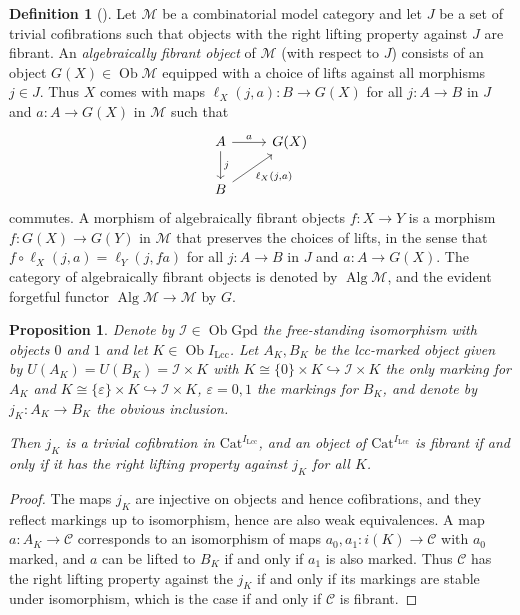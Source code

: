\documentclass[a4paper]{article}
\newtheorem{proposition}[theorem]{Proposition}
\theoremstyle{remark}
\theoremstyle{definition}
\newtheorem{definition}[theorem]{Definition}
\begin{document}
\begin{definition}[\cite{algebraic-models}]
  \label{def:algebraically-fibrant-objects}
  Let $\mathcal{M}$ be a combinatorial model category and let $J$ be a set of trivial cofibrations such that objects with the right lifting property against $J$ are fibrant.
  An \emph{algebraically fibrant object} of $\mathcal{M}$ (with respect to $J$) consists of an object $G(X) \in \operatorname{Ob} \mathcal{M}$ equipped with a choice of lifts against all morphisms $j \in J$.
  Thus $X$ comes with maps $\ell_X({j, a}) : B \rightarrow G(X)$ for all $j : A \rightarrow B$ in $J$ and $a : A \rightarrow G(X)$ in $\mathcal{M}$ such that
  \begin{equation}
    \begin{tikzcd}
      A \arrow[d, "j"] \arrow[r, "a"] & G(X) \\
      B \arrow[ur, "{\ell_X(j, a)}"']
    \end{tikzcd}
  \end{equation}
  commutes.
  A morphism of algebraically fibrant objects $f : X \rightarrow Y$ is a morphism $f : G(X) \rightarrow G(Y)$ in $\mathcal{M}$ that preserves the choices of lifts, in the sense that $f \circ \ell_X(j, a) = \ell_Y(j, fa)$ for all $j : A \rightarrow B$ in $J$ and $a : A \rightarrow G(X)$.
  The category of algebraically fibrant objects is denoted by $\operatorname{Alg} \mathcal{M}$, and the evident forgetful functor $\operatorname{Alg} \mathcal{M} \rightarrow \mathcal{M}$ by $G$.
\end{definition}

\begin{proposition}
  \label{prop:object-generating-triv-cof-marked}
  Denote by $\mathcal{I} \in \operatorname{Ob} \mathrm{Gpd}$ the free-standing isomorphism with objects $0$ and $1$ and let $K \in \operatorname{Ob} I_\mathrm{Lcc}$.
  Let $A_K, B_K$ be the lcc-marked object given by $U(A_K) = U(B_K) = \mathcal{I} \times K$ with $K \cong \{ 0 \} \times K \hookrightarrow \mathcal{I} \times K$ the only marking for $A_K$ and $K \cong \{ \varepsilon \} \times K \hookrightarrow \mathcal{I} \times K$, $\varepsilon = 0, 1$ the markings for $B_K$, and denote by $j_K : A_K \rightarrow B_K$ the obvious inclusion.

  Then $j_K$ is a trivial cofibration in $\mathrm{Cat}^{I_\mathrm{Lcc}}$, and an object of $\mathrm{Cat}^{I_\mathrm{Lcc}}$ is fibrant if and only if it has the right lifting property against $j_K$ for all $K$.
\end{proposition}
\begin{proof}
  The maps $j_K$ are injective on objects and hence cofibrations, and they reflect markings up to isomorphism, hence are also weak equivalences.
  A map $a : A_K \rightarrow \mathcal{C}$ corresponds to an isomorphism of maps $a_0, a_1 : i(K) \rightarrow \mathcal{C}$ with $a_0$ marked, and $a$ can be lifted to $B_K$ if and only if $a_1$ is also marked.
  Thus $\mathcal{C}$ has the right lifting property against the $j_K$ if and only if its markings are stable under isomorphism, which is the case if and only if $\mathcal{C}$ is fibrant.
\end{proof}
\end{document}

